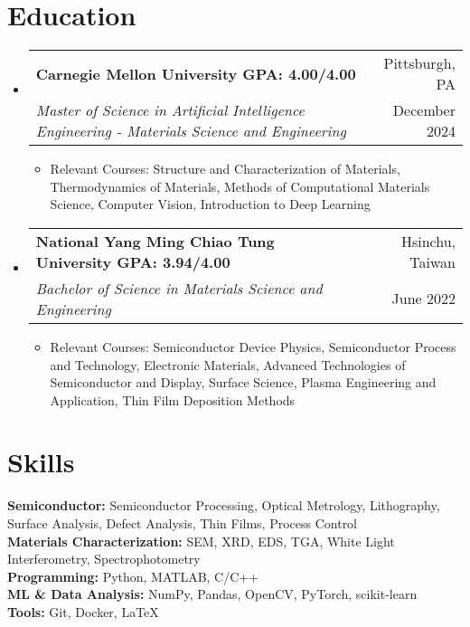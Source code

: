 \documentclass[a4paper,11pt]{article}
\makeatletter
\newcommand{\resumeItem}[1]{
  \item\small{
    {#1 \vspace{-1pt}}
  }
}
\newcommand{\resumeDoubleHeading}[4]{
  \vspace{-2pt}\item
    \begin{tabular*}{0.97\textwidth}[t]{l@{\extracolsep{\fill}}r}
        \textbf{#1} & #2 \\
        \textit{\small#3} & {\small #4} \\
    \end{tabular*}\vspace{-5pt}
}
\newcommand{\resumeSubHeadingListStart}{\begin{itemize}[leftmargin=0.15in, label={}]}
\newcommand{\resumeSubHeadingListEnd}{\end{itemize}}
\makeatother
\begin{document}
\section{Education}
\vspace{3pt}
\resumeSubHeadingListStart
    \resumeDoubleHeading
      {Carnegie Mellon University \textnormal{\small GPA: 4.00/4.00}}{Pittsburgh, PA}
      {Master of Science in Artificial Intelligence Engineering - Materials Science and Engineering}{December 2024}
    \resumeSubHeadingListStart
        \resumeItem{Relevant Courses: Structure and Characterization of Materials, Thermodynamics of Materials, Methods of Computational Materials Science, Computer Vision, Introduction to Deep Learning}
    \resumeSubHeadingListEnd
    \resumeDoubleHeading
      {National Yang Ming Chiao Tung University  \textnormal{\small GPA: 3.94/4.00}}{Hsinchu, Taiwan}
      {Bachelor of Science in Materials Science and Engineering}{June 2022}
    \resumeSubHeadingListStart
        \resumeItem{Relevant Courses: Semiconductor Device Physics, Semiconductor Process and Technology, Electronic Materials, Advanced Technologies of Semiconductor and Display, Surface Science, Plasma Engineering and Application, Thin Film Deposition Methods}
    \resumeSubHeadingListEnd   
\resumeSubHeadingListEnd


\section{Skills}
  \vspace{2pt}
  \resumeSubHeadingListStart
    \small{\item{
        \textbf{Semiconductor:}{ Semiconductor Processing, Optical Metrology, Lithography, Surface Analysis, Defect Analysis, Thin Films, Process Control} \\ 
        \vspace{3pt}
        \textbf{Materials Characterization:}{ SEM, XRD, EDS, TGA, White Light Interferometry, Spectrophotometry} \\ 
        \vspace{3pt}
        \textbf{Programming:}{ Python, MATLAB, C/C++} \\
        \vspace{3pt}
        \textbf{ML \& Data Analysis:}{ NumPy, Pandas, OpenCV, PyTorch, scikit-learn } \\ 
        \vspace{3pt}
        \textbf{Tools:}{ Git, Docker, LaTeX } \\
    }}
  \resumeSubHeadingListEnd
\end{document}

